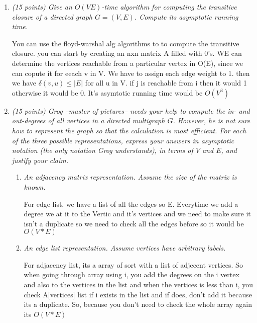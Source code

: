\documentclass[12pt]{article}
\begin{document}
\renewcommand{\headrulewidth}{0.4pt}

\vspace{-3mm}
\begin{enumerate}
    \item \textit{ (15 points) Give an $O(VE)$-time algorithm for computing the transitive closure of a directed graph $G=(V,E)$.  Compute its asymptotic running time.}

You can use the floyd-warshal alg algorithms to to compute the transitive closure. you can start by creating an nxn matrix A filled with 0's. WE can determine the vertices reachable from a particular vertex in O(E), since we can copute it for eeach v in V. We have to assign each edge weight to 1. then we have $\delta(v,u) \leq |E|$ for all u in V. if j is reachable from i then it would 1 otherwise it would be 0. It's asymtotic running time would be $O(V^3)$
    
    \pagebreak
    
	\item \textit{ (15 points) Grog --master of pictures-- needs your help to compute the in- and out-degrees of all vertices in a directed multigraph $G$. However, he is not sure how to represent the graph so that the calculation is most efficient. For each of the three possible representations, express your answers in asymptotic notation (the only notation Grog understands), in terms of $V$ and $E$, and justify your claim.}
	\begin{enumerate}
	\item\textit{ An {\em adjacency matrix} representation. Assume the size of the matrix is known.}

For edge list, we have a list of all the edges so E. Everytime we add a degree we at it to the Vertic and it’s vertices and we need to make sure it isn’t a duplicate so we need to check all the edges before so it would be $O(V*E)$
	\item\textit{ An {\em edge list} representation. Assume vertices have arbitrary labels.}

For adjacency list, its a array of sort with a list of adjecent vertices. So when going through array using i, you add the degrees on the i vertex and also to the vertices in the list and when the vertices is less than i, you check A[vertices] list if i exists in the list and if does, don’t add it because its a duplicate. So, because you don’t need to check the whole array again its $O(V*E)$


\end{enumerate}
\end{enumerate}
\end{document}

